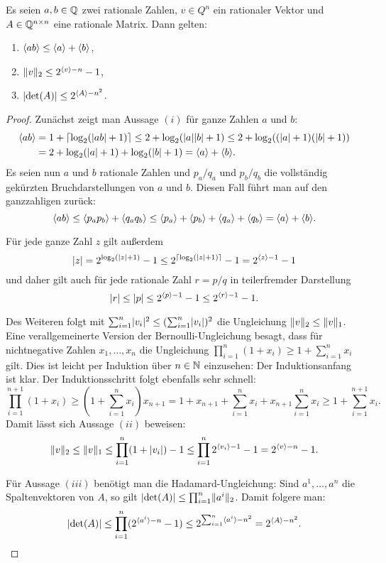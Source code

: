 \begin{proposition}\label{prop-rational-bounds-encoding}
	Es seien $a,b\in\mathbb{Q}$ zwei rationale Zahlen, $v\in Q^n$ ein rationaler Vektor und $A\in\mathbb{Q}^{n\times n}$ eine rationale Matrix.
	Dann gelten:
	\begin{enumerate}[label=(\roman*)]
		\item $\langle ab\rangle \leq \langle a\rangle+\langle b\rangle$,
		\item $\lVert v\rVert_2 \leq 2^{\langle v\rangle - n} - 1$,
		\item $\lvert\det(A)\rvert \leq 2^{\langle A\rangle - n^2}$.
	\end{enumerate}
\end{proposition}
\begin{proof}
	Zunächst zeigt man Aussage $(i)$ für ganze Zahlen $a$ und $b$:
	\begin{align*}
		\langle ab\rangle &= 1+\lceil \log_2(\lvert ab\rvert + 1) \rceil \leq 2+\log_2(\lvert a\rvert\lvert b\rvert+1) \leq 2+\log_2((\lvert a\rvert+1)(\lvert b\rvert+1))\\
		&=2+\log_2(\lvert a\rvert + 1) + \log_2(\lvert b\rvert + 1) = \langle a\rangle + \langle b\rangle.
	\end{align*}
	Es seien nun $a$ und $b$ rationale Zahlen und $p_a/q_a$ und $p_b/q_b$ die vollständig gekürzten Bruchdarstellungen von $a$ und $b$.
	Diesen Fall führt man auf den ganzzahligen zurück: \[
	\langle ab\rangle \leq \langle p_a p_b\rangle + \langle q_a q_b\rangle \leq \langle p_a\rangle+\langle p_b\rangle + \langle q_a\rangle + \langle q_b\rangle = \langle a\rangle + \langle b\rangle.\]
	
	Für jede ganze Zahl $z$ gilt außerdem 
	\[
	\lvert z\rvert = 2^{\log_2(\lvert z\rvert + 1)} - 1 \leq 2^{\lceil\log_2(\lvert z\rvert + 1)\rceil} - 1 = 2^{\langle z\rangle - 1} - 1
	\]
	und daher gilt auch für jede rationale Zahl $r = p/q$ in teilerfremder Darstellung
	\[
	\lvert r\rvert \leq \lvert p\rvert \leq 2^{\langle p\rangle -1} - 1 \leq 2^{\langle r\rangle - 1} -1.
	\]
	
	Des Weiteren folgt mit $\sum_{i=1}^n \lvert v_i\rvert^2 \leq (\sum_{i=1}^n \lvert v_i\rvert)^2$ die Ungleichung $\lVert v\rVert_2 \leq \lVert v\rVert_1$.
	Eine verallgemeinerte Version der Bernoulli-Ungleichung besagt, dass für nichtnegative Zahlen $x_1,\dots,x_n$ die Ungleichung $\prod_{i=1}^n (1+x_i) \geq 1 + \sum_{i=1}^n x_i$ gilt.
	Dies ist leicht per Induktion über $n\in\mathbb{N}$ einzusehen:
	Der Induktionsanfang ist klar.
	Der Induktionsschritt folgt ebenfalls sehr schnell:
	\[
	\prod_{i=1}^{n+1} (1+x_i) \geq (1 + \sum_{i=1}^n x_i) x_{n+1} = 1 + x_{n+1} + \sum_{i=1}^n x_i + x_{n+1} \sum_{i=1}^n x_i \geq 1 + \sum_{i=1}^{n+1} x_i.
	\]
	Damit lässt sich Aussage $(ii)$ beweisen:
	\[
		\lVert v\rVert_2 \leq \lVert v\rVert_1 \leq \prod_{i=1}^{n} (1+\lvert v_i\rvert) - 1 \leq \prod_{i=1}^n 2^{\langle v_i\rangle - 1} - 1 = 2^{\langle v\rangle - n} - 1.
	\] 
	
	Für Aussage $(iii)$ benötigt man die Hadamard-Ungleichung: Sind $a^1, \dots, a^n$ die Spaltenvektoren von $A$, so gilt $\lvert\det(A)\rvert \leq \prod_{i=1}^{n} \lVert a^i\rVert_2$.
	Damit folgere man:
	\[
		\lvert\det(A)\rvert \leq \prod_{i=1}^n (2^{\langle a^i\rangle - n} - 1) \leq 2^{\sum_{i=1}^n \langle a^i\rangle - n^2} = 2^{\langle A\rangle - n^2}.
	\]
\end{proof}

